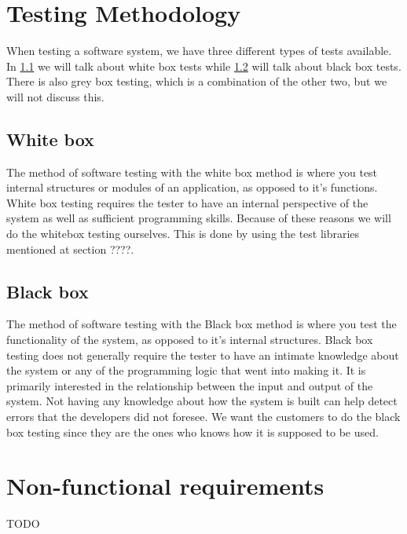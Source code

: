 \documentclass{report}
\begin{document}
\newpage
\section{Testing Methodology} \label{sec:testing_met}
When testing a software system, we have three different types of tests available. In \ref{subse:white_box} we will talk about white box tests while \ref{subsec:black_box} will talk about black box tests. There is also grey box testing, which is a combination of the other two, but we will not discuss this.

\subsection{White box} \label{subse:white_box}
The method of software testing with the white box method is where you test internal structures or modules of an application, as opposed to it's functions. White box testing requires the tester to have an internal perspective of the system as well as sufficient programming skills. Because of these reasons we will do the whitebox testing ourselves. This is done by using the test libraries mentioned at section ????. %

\subsection{Black box} \label{subsec:black_box}
The method of software testing with the Black box method is where you test the functionality of the system, as opposed to it's internal structures. Black box testing does not generally require the tester to have an intimate knowledge about the system or any of the programming logic that went into making it. It is primarily interested in the relationship between the input and output of the system. Not having any knowledge about how the system is built can help detect errors that the developers did not foresee. We want the customers to do the black box testing since they are the ones who knows how it is supposed to be used.

\newpage
\section{Non-functional requirements} \label{sec:non_func_req}
TODO

\newpage
\end{document}
